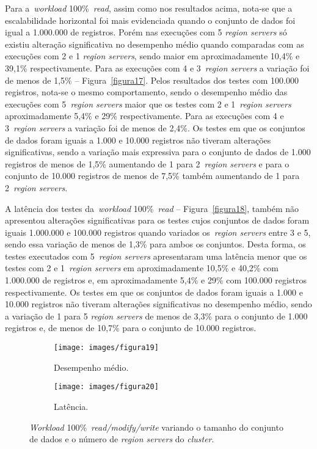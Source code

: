 \documentclass[12pt]{article}
\begin{document}
Para a~\emph{workload} 100\%~\emph{read}, assim como nos resultados acima, nota-se que a escalabilidade horizontal foi mais evidenciada quando o conjunto de dados foi igual a 1.000.000 de registros. 
Porém nas execuções com 5 \emph{region servers} só existiu alteração significativa no desempenho médio quando comparadas com as execuções com 2 e 1 \emph{region servers}, sendo maior em aproximadamente 10,4\% e 39,1\% respectivamente. 
Para as execuções com 4 e 3~\emph{region servers} a variação foi de menos de 1,5\% -- Figura~\ref{figura17}.
Pelos resultados dos testes com 100.000 registros, nota-se o mesmo comportamento, sendo o desempenho médio das execuções com 5~\emph{region servers} maior que os testes com 2 e 1~\emph{region servers} aproximadamente 5,4\% e 29\% respectivamente.
Para as execuções com 4 e 3~\emph{region servers} a variação foi de menos de 2,4\%. Os testes em que os conjuntos de dados foram iguais a 1.000 e 10.000 registros não tiveram alterações significativas, sendo a variação mais expressiva para o conjunto de dados de 1.000 registros de menos de 1,5\% aumentando de 1 para 2~\emph{region servers} e para o conjunto de 10.000 registros de menos de 7,5\% também aumentando de 1 para 2~\emph{region servers}.

A latência dos testes da~\emph{workload} 100\%~\emph{read} -- Figura~\ref{figura18}, também não apresentou alterações significativas para os testes cujos conjuntos de dados foram iguais 1.000.000 e 100.000 registros quando variados os~\emph{region servers} entre 3 e 5, sendo essa variação de menos de 1,3\% para ambos os conjuntos. Desta forma, os testes executados com 5~\emph{region servers} apresentaram uma latência menor que os testes com 2 e 1~\emph{region servers} em aproximadamente 10,5\% e 40,2\% com 1.000.000 de registros e, em aproximadamente 5,4\% e 29\% com 100.000 registros respectivamente. Os testes em que os conjuntos de dados foram iguais a 1.000 e 10.000 registros não tiveram alterações significativas no desempenho médio, sendo a variação de 1 para 5 \emph{region servers} de menos de 3,3\% para o conjunto de 1.000 registros e, de menos de 10,7\% para o conjunto de 10.000 registros.

\begin{figure*}[!ht]
    \centering
    \begin{subfigure}[b]{0.49\textwidth}
        \centering
        \texttt{[image: images/figura19]}
        \caption{Desempenho médio.}
        \label{figura19}
    \end{subfigure}
        \hfill
    \begin{subfigure}[b]{0.49\textwidth}  
        \centering 
        \texttt{[image: images/figura20]}
        \caption{Latência.}%
        \label{figura20}
    \end{subfigure}
    \caption{\emph{Workload} 100\%~\emph{read/modify/write} variando o tamanho do conjunto de dados e o número de \emph{region servers} do \emph{cluster}.}
\end{figure*}
\end{document}
